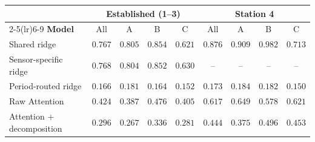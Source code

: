 \begin{tabular}{l cccc cccc}
\toprule
& \multicolumn{4}{c}{\textbf{Established (1--3)}} & \multicolumn{4}{c}{\textbf{Station 4}} \\
\cmidrule(lr){2-5}\cmidrule(lr){6-9}
\textbf{Model} & All & A & B & C & All & A & B & C \\
\midrule
Shared ridge & $0.767$ & $0.805$ & $0.854$ & $0.621$ & $0.876$ & $0.909$ & $0.982$ & $0.713$ \\
Sensor-specific ridge & $0.768$ & $0.804$ & $0.852$ & $0.630$ & -- & -- & -- & -- \\
Period-routed ridge & $0.166$ & $0.181$ & $0.164$ & $0.152$ & $0.173$ & $0.184$ & $0.182$ & $0.150$ \\
Raw Attention & $0.424$ & $0.387$ & $0.476$ & $0.405$ & $0.617$ & $0.649$ & $0.578$ & $0.621$ \\
\midrule
Attention + decomposition & $0.296$ & $0.267$ & $0.336$ & $0.281$ & $0.444$ & $0.375$ & $0.496$ & $0.453$ \\
\bottomrule
\end{tabular}
